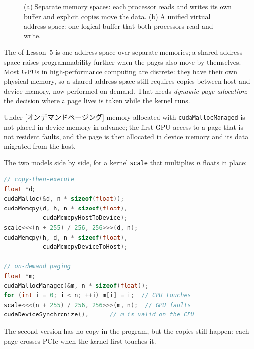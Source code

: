 \documentclass[../main.tex]{subfiles}
\begin{document}
\begin{figure}[tb]
  \centering
  
  \caption{(a) Separate memory spaces: each processor reads and writes
    its own buffer and explicit copies move the data.  (b) A unified
    virtual address space: one logical buffer that both processors read
    and write.}
  \label{fig:l07-uva}
\end{figure}

The  of Lesson~5 is one address
space over separate memories; a shared address space raises
programmability further when the pages also move by
themselves.  Most GPUs in
high-performance computing are discrete: they have their own physical
memory, so a shared address space still requires copies between host
and device memory, now performed on demand.  That needs
\emph{dynamic page allocation}: the decision where a page lives is taken
while the kernel runs.

\begin{definition}
  \label{def:l07-on-demand}
  Under [オンデマンドページング] memory
  allocated with \texttt{cudaMallocManaged} is not placed in device
  memory in advance; the first GPU access to a page that is not
  resident faults, and the page is then allocated in device memory and
  its data migrated from the host.
\end{definition}

The two models side by side, for a kernel \texttt{scale} that
multiplies $n$ floats in place:

\begin{lstlisting}[language=C++, numbers=none]
// copy-then-execute
float *d;
cudaMalloc(&d, n * sizeof(float));
cudaMemcpy(d, h, n * sizeof(float),
           cudaMemcpyHostToDevice);
scale<<<(n + 255) / 256, 256>>>(d, n);
cudaMemcpy(h, d, n * sizeof(float),
           cudaMemcpyDeviceToHost);

// on-demand paging
float *m;
cudaMallocManaged(&m, n * sizeof(float));
for (int i = 0; i < n; ++i) m[i] = i;  // CPU touches
scale<<<(n + 255) / 256, 256>>>(m, n);  // GPU faults
cudaDeviceSynchronize();      // m is valid on the CPU
\end{lstlisting}

%
The second version has no copy in the program, but the copies still
happen: each page crosses PCIe when the kernel first touches it.
\end{document}
